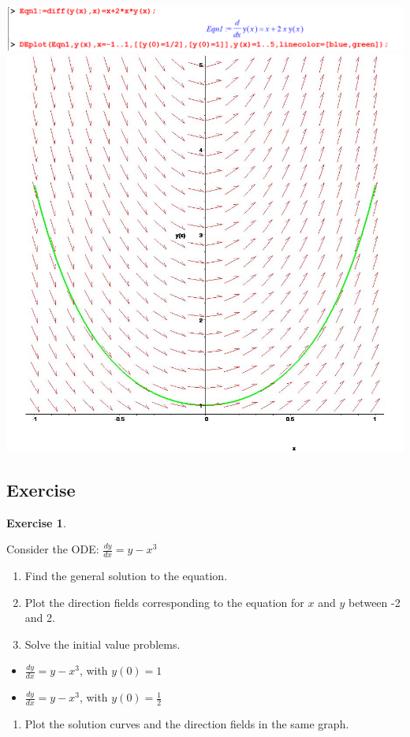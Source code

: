 \documentclass[
]{book}
\providecommand{\tightlist}{%
  \setlength{\itemsep}{0pt}\setlength{\parskip}{0pt}}
\theoremstyle{definition}
\theoremstyle{definition}
\theoremstyle{definition}
\newtheorem{exercise}{Exercise}[chapter]
\theoremstyle{definition}
\theoremstyle{remark}
\begin{document}
\includegraphics{figures/Diff/Diff 6.2 -14.png}
\includegraphics{figures/Diff/Diff 6.2 -14.jpg}

\subsection{Exercise}\label{exercise-9}

\begin{exercise}
\protect\hypertarget{exr:unnamed-chunk-53}{}\label{exr:unnamed-chunk-53}

Consider the ODE: \(\frac{dy}{dx} = y - x^3\)

\begin{enumerate}
\def\labelenumi{(\alph{enumi})}
\tightlist
\item
  Find the general solution to the equation.
\item
  Plot the direction fields corresponding to the equation for \(x\) and \(y\) between -2 and 2.
\item
  Solve the initial value problems.
\end{enumerate}

\begin{itemize}
\tightlist
\item
  \(\frac{dy}{dx} = y - x^3\), with \(y(0) = {1}\)
\item
  \(\frac{dy}{dx} = y - x^3\), with \(y(0) = \frac{1}{2}\)
\end{itemize}

\begin{enumerate}
\def\labelenumi{(\alph{enumi})}
\setcounter{enumi}{3}
\tightlist
\item
  Plot the solution curves and the direction fields in the same graph.
\end{enumerate}

\end{exercise}
\end{document}
